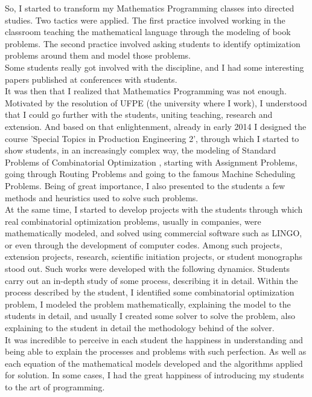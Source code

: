 \documentclass{book}
\begin{document}
So, I started to transform my Mathematics Programming classes into directed studies. Two tactics were applied. The first practice involved working in the classroom teaching the mathematical language through the modeling of book problems. The second practice involved asking students to identify optimization problems around them and model those problems. \\

Some students really got involved with the discipline, and I had some interesting papers published at conferences with students. \\

It was then that I realized that Mathematics Programming was not enough. Motivated by the resolution of UFPE (the university where I work), I understood that I could go further with the students, uniting teaching, research and extension. And based on that enlightenment, already in early 2014 I designed the course 'Special Topics in Production Engineering 2', through which I started to show students, in an increasingly complex way, the modeling of Standard Problems of Combinatorial Optimization , starting with Assignment Problems, going through Routing Problems and going to the famous Machine Scheduling Problems. Being of great importance, I also presented to the students a few methods and heuristics used to solve such problems. \\

At the same time, I started to develop projects with the students through which real combinatorial optimization problems, usually in companies, were mathematically modeled, and solved using commercial software such as LINGO, or even through the development of computer codes. Among such projects, extension projects, research, scientific initiation projects, or student monographs stood out. Such works were developed with the following dynamics. Students carry out an in-depth study of some process, describing it in detail. Within the process described by the student, I identified some combinatorial optimization problem, I modeled the problem mathematically, explaining the model to the students in detail, and usually I created some solver to solve the problem, also explaining to the student in detail the methodology behind of the solver. \\

It was incredible to perceive in each student the happiness in understanding and being able to explain the processes and problems with such perfection. As well as each equation of the mathematical models developed and the algorithms applied for solution. In some cases, I had the great happiness of introducing my students to the art of programming. \\
\end{document}
